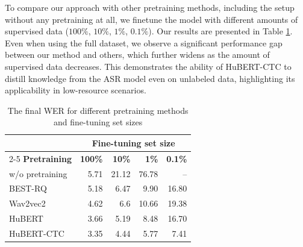 \documentclass{Interspeech}
\begin{document}
To compare our approach with other pretraining methods, including the setup without any pretraining at all, we finetune the model with different amounts of supervised data ($100\%$, $10\%$, $1\%$, $0.1\%$). Our results are presented in Table \ref{tab:pre_methods}. Even when using the full dataset, we observe a significant performance gap between our method and others, which further widens as the amount of supervised data decreases. This demonstrates the ability of HuBERT-CTC to distill knowledge from the ASR model even on unlabeled data, highlighting its applicability in low-resource scenarios.

\begin{table}[th]
  \caption{The final WER for different pretraining methods and fine-tuning set sizes}
  \label{tab:pre_methods}
  \centering
  \begin{tabular}{ lrrrr}
    \toprule
     & \multicolumn{4}{c}{\textbf{Fine-tuning set size}} \\
    \cmidrule(lr){2-5}
    \textbf{Pretraining} & \textbf{100\%} &
    \textbf{10\%} & \textbf{1\%} & \textbf{0.1\%} \\
    \midrule
    w/o pretraining & 5.71 & 21.12 & 76.78 & {--} \\
    BEST-RQ & 5.18 & 6.47 & 9.90 & 16.80 \\
    Wav2vec2 & 4.62 & 6.6 & 10.66 & 19.38 \\
    HuBERT & 3.66 & 5.19 & 8.48 & 16.70 \\
    HuBERT-CTC & 3.35 & 4.44 & 5.77 & 7.41 \\
    \bottomrule
  \end{tabular}
\end{table}
\end{document}
